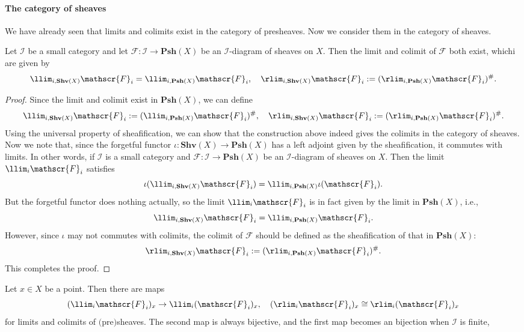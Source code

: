 \paragraph{The category of sheaves}
We have already seen that limits and colimits exist in the category of presheaves. Now we consider them in the category of sheaves.
\begin{proposition}
Let $\mathcal{I}$ be a small category and let $\mathscr{F}:\mathcal{I}\to\mathbf{Psh}(X)$ be an $\mathcal{I}$-diagram of sheaves on $X$. Then the limit and colimit of $\mathscr{F}$ both exist, whichi are given by
\[\llim_{i,\mathbf{Shv}(X)}\mathscr{F}_i=\llim_{i,\mathbf{Psh}(X)}\mathscr{F}_i,\quad \rlim_{i,\mathbf{Shv}(X)}\mathscr{F}_i:=(\rlim_{i,\mathbf{Psh}(X)}\mathscr{F}_i)^{\#}.\]
\end{proposition}
\begin{proof}
Since the limit and colimit exist in $\mathbf{Psh}(X)$, we can define
\[\llim_{i,\mathbf{Shv}(X)}\mathscr{F}_i:=(\llim_{i,\mathbf{Psh}(X)}\mathscr{F}_i)^{\#},\quad \rlim_{i,\mathbf{Shv}(X)}\mathscr{F}_i:=(\rlim_{i,\mathbf{Psh}(X)}\mathscr{F}_i)^{\#}.\]
Using the universal property of sheafification, we can show that the construction above indeed gives the colimits in the category of sheaves. Now we note that, since the forgetful functor $\iota:\mathbf{Shv}(X)\to\mathbf{Psh}(X)$ has a left adjoint given by the sheafification, it commutes with limits. In other words, if $\mathcal{I}$ is a small category and $\mathscr{F}:\mathcal{I}\to\mathbf{Psh}(X)$ be an $\mathcal{I}$-diagram of sheaves on $X$. Then the limit $\llim_i\mathscr{F}_i$ satisfies
\[\iota(\llim_{i,\mathbf{Shv}(X)}\mathscr{F}_i)=\llim_{i,\mathbf{Psh}(X)}\iota(\mathscr{F}_i).\]
But the forgetful functor does nothing actually, so the limit $\llim_i\mathscr{F}_i$ is in fact given by the limit in $\mathbf{Psh}(X)$, i.e.,
\[\llim_{i,\mathbf{Shv}(X)}\mathscr{F}_i=\llim_{i,\mathbf{Psh}(X)}\mathscr{F}_i.\]
However, since $\iota$ may not commutes with colimits, the colimit of $\mathscr{F}$ should be defined as the sheafification of that in $\mathbf{Psh}(X)$:
\[\rlim_{i,\mathbf{Shv}(X)}\mathscr{F}_i:=(\rlim_{i,\mathbf{Psh}(X)}\mathscr{F}_i)^{\#}.\]
This completes the proof.
\end{proof}
\begin{proposition}
Let $x\in X$ be a point. Then there are maps
\[(\llim_i\mathscr{F}_i)_x\to\llim_i(\mathscr{F}_i)_x,\quad (\rlim_i\mathscr{F}_i)_x\cong\rlim_i(\mathscr{F}_i)_x\]
for limits and colimits of $($pre$)$sheaves. The second map is always bijective, and the first map becomes an bijection when $\mathcal{I}$ is finite,
\end{proposition}

